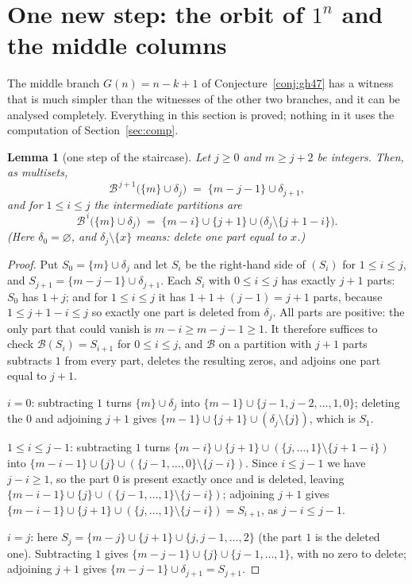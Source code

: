 \documentclass[11pt]{article}
\newtheorem{lemma}[theorem]{Lemma}
\theoremstyle{definition}
\newcommand{\B}{\mathcal{B}}
\renewcommand{\le}{\leqslant}
\renewcommand{\ge}{\geqslant}
\begin{document}
\section{One new step: the orbit of $1^n$ and the middle columns}\label{sec:new}

The middle branch $G(n)=n-k+1$ of Conjecture~\ref{conj:gh47} has a witness that is much simpler than the witnesses
of the other two branches, and it can be analysed completely.  Everything in this section is proved; nothing in it
uses the computation of Section~\ref{sec:comp}.

\begin{lemma}[one step of the staircase]\label{lem:step}
Let $j\ge0$ and $m\ge j+2$ be integers.  Then, as multisets,
\[
\B^{\,j+1}\bigl(\{m\}\cup\delta_j\bigr)\;=\;\{m-j-1\}\cup\delta_{j+1},
\]
and for $1\le i\le j$ the intermediate partitions are
\[
\B^{\,i}\bigl(\{m\}\cup\delta_j\bigr)\;=\;\{m-i\}\cup\{j+1\}\cup\bigl(\delta_j\setminus\{j+1-i\}\bigr).
\tag{$S_i$}
\]
(Here $\delta_0=\varnothing$, and $\delta_j\setminus\{x\}$ means: delete one part equal to $x$.)
\end{lemma}

\begin{proof}
Put $S_0=\{m\}\cup\delta_j$ and let $S_i$ be the right-hand side of $(S_i)$ for $1\le i\le j$, and
$S_{j+1}=\{m-j-1\}\cup\delta_{j+1}$.  Each $S_i$ with $0\le i\le j$ has exactly $j+1$ parts: $S_0$ has $1+j$; and
for $1\le i\le j$ it has $1+1+(j-1)=j+1$ parts, because $1\le j+1-i\le j$ so exactly one part is deleted from
$\delta_j$.  All parts are positive: the only part that could vanish is $m-i\ge m-j-1\ge1$.  It therefore suffices
to check $\B(S_i)=S_{i+1}$ for $0\le i\le j$, and $\B$ on a partition with $j+1$ parts subtracts $1$ from every
part, deletes the resulting zeros, and adjoins one part equal to $j+1$.

\smallskip
\noindent$i=0$: subtracting $1$ turns $\{m\}\cup\delta_j$ into $\{m-1\}\cup\{j-1,j-2,\dots,1,0\}$; deleting the $0$
and adjoining $j+1$ gives $\{m-1\}\cup\{j+1\}\cup(\delta_j\setminus\{j\})$, which is $S_1$.

\smallskip
\noindent$1\le i\le j-1$: subtracting $1$ turns
$\{m-i\}\cup\{j+1\}\cup(\{j,\dots,1\}\setminus\{j+1-i\})$ into
$\{m-i-1\}\cup\{j\}\cup(\{j-1,\dots,0\}\setminus\{j-i\})$.  Since $i\le j-1$ we have $j-i\ge1$, so the part $0$ is
present exactly once and is deleted, leaving
$\{m-i-1\}\cup\{j\}\cup(\{j-1,\dots,1\}\setminus\{j-i\})$; adjoining $j+1$ gives
$\{m-i-1\}\cup\{j+1\}\cup(\{j,\dots,1\}\setminus\{j-i\})=S_{i+1}$, as $j-i\le j-1$.

\smallskip
\noindent$i=j$: here $S_j=\{m-j\}\cup\{j+1\}\cup\{j,j-1,\dots,2\}$ (the part $1$ is the deleted one).  Subtracting
$1$ gives $\{m-j-1\}\cup\{j\}\cup\{j-1,\dots,1\}$, with no zero to delete; adjoining $j+1$ gives
$\{m-j-1\}\cup\delta_{j+1}=S_{j+1}$.
\end{proof}
\end{document}
